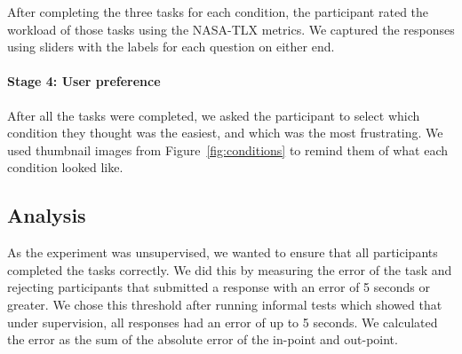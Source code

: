 
After completing the three tasks for each condition, the participant rated the workload of those tasks
using the NASA-TLX metrics. We captured the responses using sliders with the labels for each question on either end.

\paragraph{Stage 4: User preference}
After all the tasks were completed, we asked the participant to select which condition they thought was the easiest,
and which was the most frustrating. We used thumbnail images from Figure~\ref{fig:conditions} to remind them of what
each condition looked like.

\subsection{Analysis}\label{sec:waveform-analysis}
As the experiment was unsupervised, we wanted to ensure that all participants completed the tasks correctly.  We did
this by measuring the error of the task and rejecting participants that submitted a response with an error of 5 seconds
or greater. We chose this threshold after running informal tests which showed that under supervision, all responses had
an error of up to 5 seconds.  We calculated the error as the sum of the absolute error of the in-point and
out-point.


